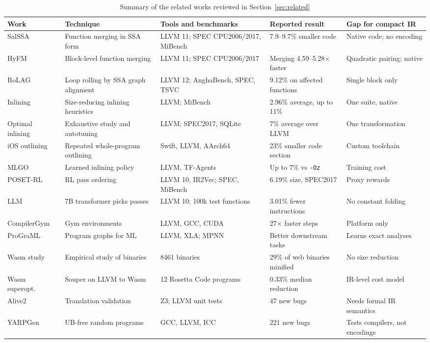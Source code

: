 \documentclass{ieeeaccess}
\begin{document}
\begin{table}[!t]
\centering
\caption{Summary of the related works reviewed in Section~\ref{sec:related}}
\label{tab:related}
\footnotesize
\setlength{\tabcolsep}{3pt}
\begin{tabular}{@{}p{23mm} p{38mm} p{37mm} p{35mm} p{33mm}@{}}
\toprule
Work & Technique & Tools and benchmarks & Reported result & Gap for compact IR \\
\midrule
SalSSA~\cite{rocha2020salssa} & Function merging in SSA form & LLVM 11; SPEC CPU2006/2017, MiBench & 7.9--9.7\% smaller code & Native code; no encoding \\
HyFM~\cite{rocha2021hyfm} & Block-level function merging & LLVM 11; SPEC CPU2006/2017 & Merging 4.59--5.28$\times$ faster & Quadratic pairing; native \\
RoLAG~\cite{rocha2022rolag} & Loop rolling by SSA graph alignment & LLVM 12; AnghaBench, SPEC, TSVC & 9.12\% on affected functions & Single block only \\
Inlining~\cite{damasio2021inlining} & Size-reducing inlining heuristics & LLVM; MiBench & 2.96\% average, up to 11\% & One suite, native \\
Optimal inlining~\cite{theodoridis2022inlining} & Exhaustive study and autotuning & LLVM; SPEC2017, SQLite & 7\% average over LLVM & One transformation \\
iOS outlining~\cite{chabbi2021ios} & Repeated whole-program outlining & Swift, LLVM, AArch64 & 23\% smaller code section & Custom toolchain \\
MLGO~\cite{trofin2021mlgo} & Learned inlining policy & LLVM, TF-Agents & Up to 7\% vs \texttt{-Oz} & Training cost \\
POSET-RL~\cite{jain2022posetrl} & RL pass ordering & LLVM 10, IR2Vec; SPEC, MiBench & 6.19\% size, SPEC2017 & Proxy rewards \\
LLM~\cite{cummins2023llm} & 7B transformer picks passes & LLVM 10; 100k test functions & 3.01\% fewer instructions & No constant folding \\
CompilerGym~\cite{cummins2021compilergym} & Gym environments & LLVM, GCC, CUDA & 27$\times$ faster steps & Platform only \\
ProGraML~\cite{cummins2021programl} & Program graphs for ML & LLVM, XLA; MPNN & Better downstream tasks & Learns exact analyses \\
Wasm study~\cite{hilbig2021wasm} & Empirical study of binaries & 8461 binaries & 29\% of web binaries minified & No size reduction \\
Wasm superopt.~\cite{cabrera2020superopt} & Souper on LLVM to Wasm & 12 Rosetta Code programs & 0.33\% median reduction & IR-level cost model \\
Alive2~\cite{lopes2021alive2} & Translation validation & Z3; LLVM unit tests & 47 new bugs & Needs formal IR semantics \\
YARPGen~\cite{livinskii2020yarpgen} & UB-free random programs & GCC, LLVM, ICC & 221 new bugs & Tests compilers, not encodings \\
\bottomrule
\end{tabular}
\end{table}
\end{document}
